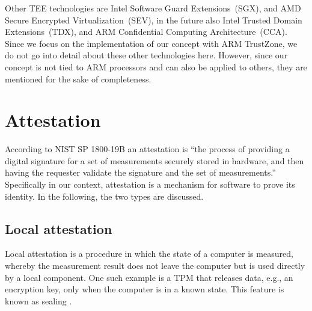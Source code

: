Other \ac{TEE} technologies are Intel Software Guard Extensions~(SGX), and AMD Secure Encrypted Virtualization~(SEV), in the future also Intel Trusted Domain Extensions~(TDX), and ARM Confidential Computing Architecture~(CCA). Since we focus on the implementation of our concept with ARM TrustZone, we do not go into detail about these other technologies here. However, since our concept is not tied to ARM processors and can also be applied to others, they are mentioned for the sake of completeness.





\section{Attestation}


According to NIST SP 1800-19B \cite{Bartock2022} an attestation is ``the process of providing a digital signature for a set of measurements securely stored in hardware, and then having the requester validate the signature and the set of measurements.''
Specifically in our context, attestation is a mechanism for software to prove its identity.
In the following, the two types are discussed.


\subsection{Local attestation}

Local attestation is a procedure in which the state of a computer is measured, whereby the measurement result does not leave the computer but is used directly by a local component. One such example is a \ac{TPM} that releases data, e.g., an encryption key, only when the computer is in a known state. This feature is known as sealing \cite{tpm}.


